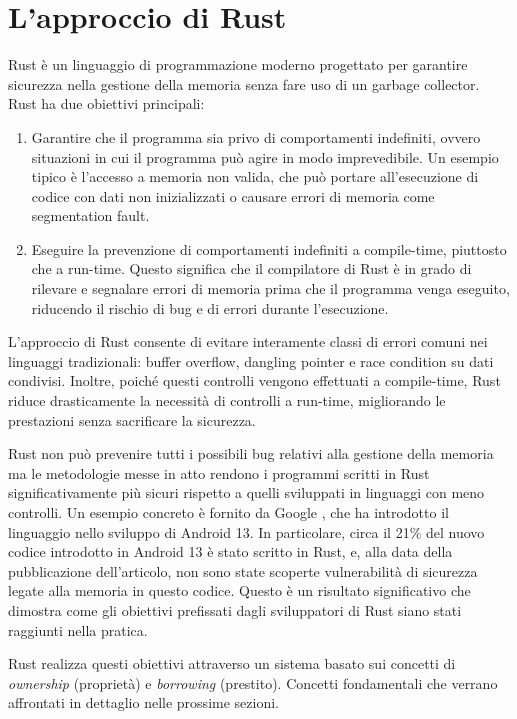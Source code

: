 \section{L'approccio di Rust}
Rust è un linguaggio di programmazione moderno progettato per garantire sicurezza nella gestione della memoria senza fare uso di un garbage collector. Rust ha due obiettivi principali:
\begin{enumerate}
    \item  Garantire che il programma sia privo di comportamenti indefiniti, ovvero situazioni in cui il programma può agire in modo imprevedibile. Un esempio tipico è l'accesso a memoria non valida, che può portare all'esecuzione di codice con dati non inizializzati o causare errori di memoria come segmentation fault. 
    \item Eseguire la prevenzione di comportamenti indefiniti a compile-time, piuttosto che a run-time. Questo significa che il compilatore di Rust è in grado di rilevare e segnalare errori di memoria prima che il programma venga eseguito, riducendo il rischio di bug e di errori durante l'esecuzione. 
\end{enumerate}
L'approccio di Rust consente di evitare interamente classi di errori comuni nei linguaggi tradizionali: buffer overflow, dangling pointer e race condition su dati condivisi. Inoltre, poiché questi controlli vengono effettuati a compile-time, Rust riduce drasticamente la necessità di controlli a run-time, migliorando le prestazioni senza sacrificare la sicurezza. 

Rust non può prevenire tutti i possibili bug relativi alla gestione della memoria ma le metodologie messe in atto rendono i programmi scritti in Rust significativamente più sicuri rispetto a quelli sviluppati in linguaggi con meno controlli. Un esempio concreto è fornito da Google \cite{android13-memorysafe}, che ha introdotto il linguaggio nello sviluppo di Android 13. In particolare, circa il 21\% del nuovo codice introdotto in Android 13 è stato scritto in Rust, e, alla data della pubblicazione dell'articolo, non sono state scoperte vulnerabilità di sicurezza legate alla memoria in questo codice. Questo è un risultato significativo che dimostra come gli obiettivi prefissati dagli sviluppatori di Rust siano stati raggiunti nella pratica.

Rust realizza questi obiettivi attraverso un sistema basato sui concetti di \textit{ownership} (proprietà) e \textit{borrowing} (prestito). Concetti fondamentali che verrano affrontati in dettaglio nelle prossime sezioni.

